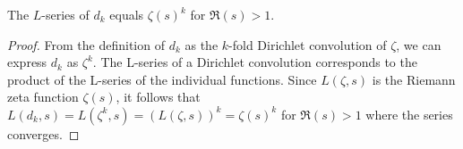 \begin{theorem}
\label{LSeries_d_eq_riemannZeta_pow}
\leanok
The $L$-series of $d_k$ equals $\zeta(s)^k$ for $\Re(s) > 1$.
\end{theorem}
\begin{proof}
\leanok
From the definition of $d_k$ as the $k$-fold Dirichlet convolution of $\zeta$, we can express $d_k$ as $\zeta^k$. The L-series of a Dirichlet convolution corresponds to the product of the L-series of the individual functions. Since $L(\zeta, s)$ is the Riemann zeta function $\zeta(s)$, it follows that $L(d_k, s) = L(\zeta^k, s) = (L(\zeta, s))^k = \zeta(s)^k$ for $\Re(s) > 1$ where the series converges.
\end{proof}
